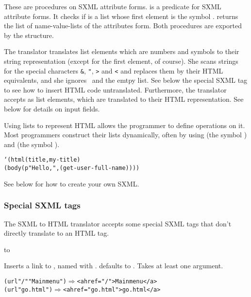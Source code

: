 \begin{desc}
  These are procedures on SXML attribute forms.  
  is  a predicate for SXML attribute forms.  It checks if 
  is a list whose first element is the symbol .
   returns the list of name-value-lists
  of the attributes form.  Both procedures are exported by the
   structure.
\end{desc}

The translator translates list elements which are numbers and symbols
to their string representation (except for the first element, of
course).  She scans strings for the special characters \verb'&',
\verb'"', \verb'>' and \verb'<' and replaces them by their HTML
equivalents, and she ignores \sharpf\ and the emtpy list.  See below
the special SXML tag  to see how to insert HTML code
untranslated.  Furthermore, the translator accepts 
as list elements, which are translated to their HTML representation.
See below for details on input fields.

Using lists to represent HTML allows the programmer to define
operations on it.  Most programmers construct their lists dynamically,
often by using  (the symbol ) and 
(the symbol \ex{,}).  \Eg

\begin{alltt}
 `(html (title ,my-title) 
        (body (p "Hello, " ,(get-user-full-name))))
\end{alltt}

See below for how to create your own SXML.

\subsubsection{Special SXML tags}

The SXML to HTML translator accepts some special SXML tags that don't
directly translate to an HTML tag.

\newcommand{\defsxmltag}     {\par\medskip\defsxmltagx}
\newcommand{\defsxmltagx}[2]%
{\hbox to \linewidth{\ttchars%
     {\ttt(#1\testvoid{#2}{}{\ }{\sem{#2}}\testvoid{#2}{}{\/})
\hfill\quad\textnormal{SXML-tag}}}\index{#1}}


\defsxmltag{url}{ URL [text]}
\begin{desc}
  Inserts a link to , named with .  
  defaults to .  Takes at least one argument.  \Eg
  
  \begin{alltt}
  (url "/" "Main menu") \ensuremath{\Longrightarrow} <a href="/">Main menu</a>
  (url "go.html")       \ensuremath{\Longrightarrow} <a href="go.html">go.html</a>
  \end{alltt}  

\end{desc}

